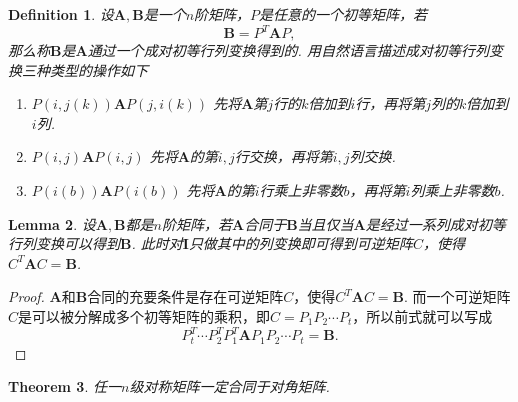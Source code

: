 \documentclass{article}
\newtheorem{theorem}{Theorem}[section]
\newtheorem{lemma}[theorem]{Lemma}
\newtheorem{definition}[theorem]{Definition}
\newcommand{\mbf}[1]{\bm{#1}}
\begin{document}
\begin{definition}
\rm 设$\mbf{A},\mbf{B}$是一个$n$阶矩阵，$P$是任意的一个初等矩阵，若
$$
\mbf{B} = P^T\mbf{A}P,
$$
那么称$\mbf{B}$是$\mbf{A}$通过一个{\color{red}成对初等行列变换}得到的. 用自然语言描述成对初等行列变换三种类型的操作如下
\begin{enumerate}
	\item $P(i,j(k))\mbf{A}P(j,i(k))$ 先将$\mbf{A}$第$j$行的$k$倍加到$i$行，再将第$j$列的$k$倍加到$i$列.
	\item $P(i,j)\mbf{A}P(i,j)$ 先将$\mbf{A}$的第$i,j$行交换，再将第$i,j$列交换.
	\item $P(i(b))\mbf{A}P(i(b))$ 先将$\mbf{A}$的第$i$行乘上非零数$b$，再将第$i$列乘上非零数$b$.
\end{enumerate}
\end{definition}

\begin{lemma}\label{congruent: lemma1}
\rm 设$\mbf{A},\mbf{B}$都是$n$阶矩阵，若$\mbf{A}$合同于$\mbf{B}$当且仅当$\mbf{A}$是经过一系列成对初等行列变换可以得到$\mbf{B}$. 此时对$\mbf{I}$只做其中的列变换即可得到可逆矩阵$C$，使得$C^T\mbf{A}C = \mbf{B}$.
\end{lemma}

\begin{proof}
$\mbf{A}$和$\mbf{B}$合同的充要条件是存在可逆矩阵$C$，使得$C^T\mbf{A}C=\mbf{B}$. 而一个可逆矩阵$C$是可以被分解成多个初等矩阵的乘积，即$C=P_1P_2\cdots P_t$，所以前式就可以写成
$$
P_t^T\cdots P_2^TP_1^T\mbf{A}P_1P_2\cdots P_t = \mbf{B}.
$$
\end{proof}

\begin{theorem}
\rm 任一$n$级对称矩阵一定合同于对角矩阵. 
\end{theorem}
\end{document}

